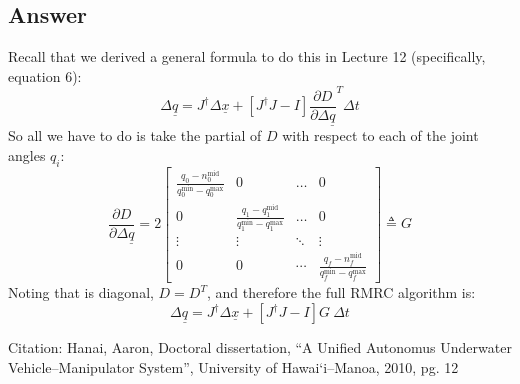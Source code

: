 \documentclass[]{article}
\begin{document}
\subsection{Answer}
Recall that we derived a general formula to do this in Lecture 12 (specifically, equation 6):
\begin{displaymath}
\Delta\underline{q} = J^{\dag}\Delta\underline{x} + \left[ J^{\dag}J-I\right] \frac{\partial D}{\partial \Delta\underline{q}}^{T}\Delta t
\end{displaymath}
So all we have to do is take the partial of $D$ with respect to each of the joint angles $q_{i}$:
\begin{displaymath}
	\frac{\partial D}{\partial \Delta\underline{q}} = 2\left[
		\begin{matrix}
			\frac{q_{0} - n_{0}^{\mathrm{mid}}}{q_{0}^{\mathrm{min}} - q_{0}^{\mathrm{max}}} & 0 & \dots & 0 \\
			0 & \frac{q_{1} - q_{1}^{\mathrm{mid}}}{q_{1}^{\mathrm{min}} - q_{1}^{\mathrm{max}}} & \dots & 0 \\
			\vdots & \vdots & \ddots & \vdots \\
			0 & 0 & \cdots & \frac{q_{f} - n_{f}^{\mathrm{mid}}}{q_{f}^{\mathrm{min}} - q_{f}^{\mathrm{max}}}
		\end{matrix} \right] \triangleq G
\end{displaymath}
Noting that is diagonal, $D=D^{T}$, and therefore the full RMRC algorithm is:
\begin{displaymath}
\Delta\underline{q} = J^{\dag}\Delta\underline{x} + \left[ J^{\dag}J-I\right]G\ \Delta t
\end{displaymath}

Citation: Hanai, Aaron, Doctoral dissertation, ``A Unified Autonomus Underwater Vehicle--Manipulator System'', University of Hawai`i--Manoa, 2010, pg. 12
\end{document}
